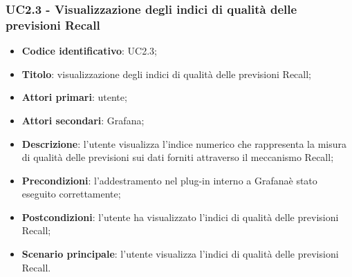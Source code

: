 \subsubsection{UC2.3 - Visualizzazione degli indici di qualità delle previsioni Recall}
\begin{itemize}
	\item \textbf{Codice identificativo}: UC2.3;
	\item \textbf{Titolo}: visualizzazione degli indici di qualità delle previsioni Recall\glo;
	\item \textbf{Attori primari}: utente;
	\item \textbf{Attori secondari}: Grafana\glo;
	\item \textbf{Descrizione}: l'utente visualizza l'indice numerico che rappresenta la misura di qualità delle previsioni sui dati forniti attraverso il meccanismo Recall\glo;
	\item \textbf{Precondizioni}: l'addestramento nel plug-in interno a Grafana\glosp è stato eseguito correttamente;
	\item \textbf{Postcondizioni}: l'utente ha visualizzato l'indici di qualità delle previsioni Recall\glo;
	\item \textbf{Scenario principale}: l'utente visualizza l'indici di qualità delle previsioni Recall\glo.
\end{itemize} 
